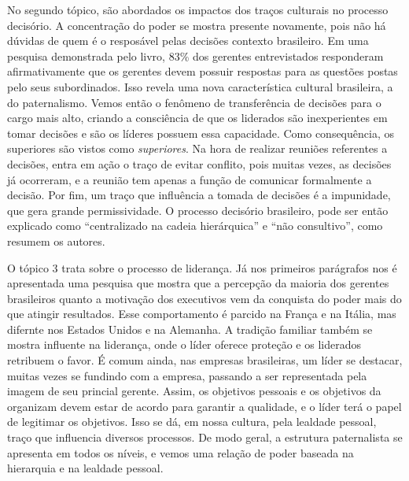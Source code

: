 \documentclass[11pt, a4paper]{article}
\begin{document}
No segundo tópico, são abordados os impactos dos traços culturais no processo decisório. A concentração do poder se mostra presente novamente, pois não há dúvidas de quem é o resposável pelas decisões contexto brasileiro. Em uma pesquisa demonstrada pelo livro, 83\% dos gerentes entrevistados responderam afirmativamente que os gerentes devem possuir respostas para as questões postas pelo seus subordinados. Isso revela uma nova característica cultural brasileira, a do paternalismo. Vemos então o fenômeno de transferência de decisões para o cargo mais alto, criando a consciência de que os liderados são inexperientes em tomar decisões e são os líderes possuem essa capacidade. Como consequência, os superiores são vistos como \emph{superiores}. Na hora de realizar reuniões referentes a decisões, entra em ação o traço de evitar conflito, pois muitas vezes, as decisões já ocorreram, e a reunião tem apenas a função de comunicar formalmente a decisão. Por fim, um traço que influência a tomada de decisões é a impunidade, que gera grande permissividade. O processo decisório brasileiro, pode ser então explicado como ``centralizado na cadeia hierárquica'' e ``não consultivo'', como resumem os autores.

O tópico 3 trata sobre o processo de liderança. Já nos primeiros parágrafos nos é apresentada uma pesquisa que mostra que a percepção da maioria dos gerentes brasileiros quanto a motivação dos executivos vem da conquista do poder mais do que atingir resultados. Esse comportamento é parcido na França e na Itália, mas difernte nos Estados Unidos e na Alemanha. A tradição familiar também se mostra influente na liderança, onde o líder oferece proteção e os liderados retribuem o favor. É comum ainda, nas empresas brasileiras, um líder se destacar, muitas vezes se fundindo com a empresa, passando a ser representada pela imagem de seu princial gerente. Assim, os objetivos pessoais e os objetivos da organizam devem estar de acordo para garantir a qualidade, e o líder terá o papel de legitimar os objetivos. Isso se dá, em nossa cultura, pela lealdade pessoal, traço que influencia diversos processos. De modo geral, a estrutura paternalista se apresenta em todos os níveis, e vemos uma relação de poder baseada na hierarquia e na lealdade pessoal.
\end{document}
